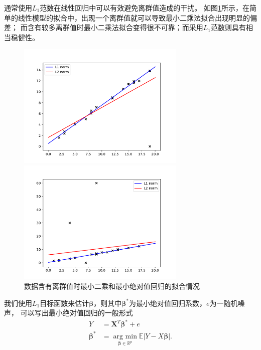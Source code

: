 通常使用$L_1$范数在线性回归中可以有效避免离群值造成的干扰。
如图\ref{fig2.1}所示，在简单的线性模型的拟合中，出现一个离群值就可以导致最小二乘法拟合出现明显的偏差；
    而含有较多离群值时最小二乘法拟合变得很不可靠；而采用$L_1$范数则具有相当稳健性。
\begin{figure}[H]
    \centering
    \begin{minipage}[t]{0.48\textwidth}
    \includegraphics[width=8cm]{pics/chapter2/l1-l2-diff2.pdf}
    \end{minipage}
    \begin{minipage}[t]{0.48\textwidth}
    \includegraphics[width=8cm]{pics/chapter2/l1-l2-diff.pdf}
    \end{minipage}
    \caption{\small 数据含有离群值时最小二乘和最小绝对值回归的拟合情况}
    \label{fig2.1}

\end{figure}

我们使用$L_1$目标函数来估计$\bm{\beta}$，则其中$\bm{\beta}^*$为最小绝对值回归系数，$e$为一随机噪声，
可以写出最小绝对值回归的一般形式
\begin{equation} \label{l1losstotal}
    \begin{split}
    Y &= \bm{X}^T\bm{\beta}^* + e\\
    \bm{\beta}^* &= \underset{\bm{\beta}\in \mathbb{R}^{p}}{\operatorname {arg\ min}}
    \mathbb{E}|Y - X\bm{\beta}|.
    \end{split}
\end{equation}

